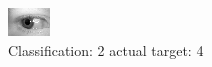 \begin{figure}[h!]
\begin{center}
\includegraphics[width=0.60\columnwidth]{figures/ID723_class_2_target_4.png}
\end{center}
\caption{ Classification: 2 actual target: 4}
\label{fig:ID723_class_2_target_4}
\end{figure}
